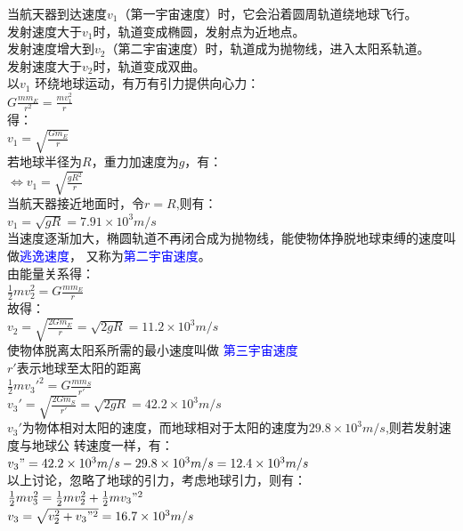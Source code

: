 \begin{exercise}[宇宙速度]
		当航天器到达速度$v_1$（第一宇宙速度）时，它会沿着圆周轨道绕地球飞行。\\
		发射速度大于$v_1$时，轨道变成椭圆，发射点为近地点。\\
		发射速度增大到$v_2$（第二宇宙速度）时，轨道成为抛物线，进入太阳系轨道。\\
		发射速度大于$v_2$时，轨道变成双曲。\\
		以$v_1$ 环绕地球运动，有万有引力提供向心力：\\
		\centering $G\frac{mm_E}{r^2}=\frac{mv_1^2}{r}$\\
		 得：\\
		$v_1 = \sqrt{\frac{Gm_E}{r} } $\\
		若地球半径为$R$，重力加速度为$g$，有：\\
		$\Leftrightarrow v_1 = \sqrt{\frac{gR^2}{r} } $\\
		当航天器接近地面时，令$r = R$,则有：\\
		$v_1 = \sqrt{gR} = 7.91\times 10^3 m/ s$\\
		当速度逐渐加大，椭圆轨道不再闭合成为抛物线，能使物体挣脱地球束缚的速度叫做\textcolor{blue}{逃逸速度}，
		又称为\textcolor{blue}{第二宇宙速度}。\\
		由能量关系得：\\
		$\frac{1}{2}mv_2^2 = G\frac{mm_E}{r} $ \\
		故得：\\
		$v_2 = \sqrt{\frac{2Gm_E}{r}} = \sqrt{2gR} = 11.2\times 10^3 m/ s $\\
		使物体脱离太阳系所需的最小速度叫做\textcolor{blue}{ 第三宇宙速度}\\
		$r'$表示地球至太阳的距离\\
		$\frac{1}{2}mv_3'^2 = G\frac{mm_S}{r'} $ \\
		$v_3' = \sqrt{\frac{2Gm_S}{r'}} = \sqrt{2gR} = 42.2\times 10^3 m/ s $\\
		$v_3'$为物体相对太阳的速度，而地球相对于太阳的速度为$29.8\times 10^3 m/ s $,则若发射速度与地球公
		转速度一样，有：\\
		$v_3" = 42.2\times 10^3 m/ s - 29.8\times 10^3 m/ s = 12.4\times 10^3 m/ s$\\
		以上讨论，忽略了地球的引力，考虑地球引力，则有：\\
		$\frac{1}{2}mv_3^2 = \frac{1}{2}mv_2^2 + \frac{1}{2}mv_3"^2$\\
		$v_3 = \sqrt{v_2^2 + v_3"^2} = 16.7\times 10^3 m/ s$\\
		\end{exercise}